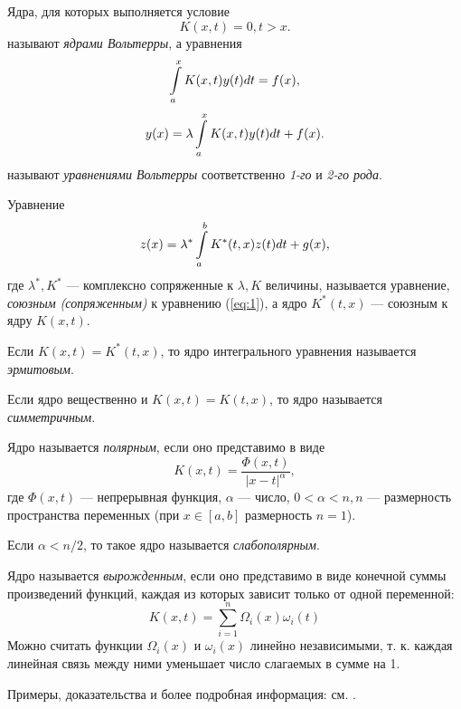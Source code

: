 Ядра, для которых выполняется условие
$$K(x, t) = 0, t > x.$$
называют \textit{ядрами Вольтерры}, а уравнения
$$\int\displaylimits_a^x K(x, t)y(t)dt = f(x),$$
$$y(x) = \lambda \int\displaylimits_a^xK(x, t) y(t) dt + f(x).$$
называют \textit{уравнениями Вольтерры} соответственно \textit{1-го} и \textit{2-го рода}.

Уравнение
$$z(x) = \lambda^* \int\displaylimits_a^b K^*(t, x)z(t)dt + g(x),$$
где $\lambda^*, K^*$ --- комплексно сопряженные к $\lambda, K$ величины, называется уравнение, \textit{союзным (сопряженным)} к уравнению (\ref{eq:1}), а ядро $K^*(t, x)$ --- союзным к ядру $K(x, t)$.

Если $K(x, t) = K^*(t, x)$, то ядро интегрального уравнения называется \textit{эрмитовым}.

Если ядро вещественно и $K(x, t) = K(t, x)$, то ядро называется \textit{симметричным}.

Ядро называется \textit{полярным}, если оно представимо в виде
$$K(x, t) = \frac{\Phi(x, t)}{|x - t|^\alpha},$$
где $\Phi(x, t)$ --- непрерывная функция, $\alpha$ --- число, $0 < \alpha < n, n$ --- размерность пространства переменных (при $x \in [a, b]$ размерность $n = 1$).

Если $\alpha < n / 2$, то такое ядро называется \textit{слабополярным}.

Ядро называется \textit{вырожденным}, если оно представимо в виде конечной суммы произведений функций, каждая из которых зависит только от одной переменной:
$$K(x, t) = \sum_{i = 1}^{n} \Omega_i(x)\omega_i(t)$$
Можно считать функции $\Omega_i(x)$ и $\omega_i(x)$ линейно независимыми, т. к. каждая линейная связь между ними уменьшает число слагаемых в сумме на 1.

Примеры, доказательства и более подробная информация: см. \cite[с.~5]{int-diff-equations}.